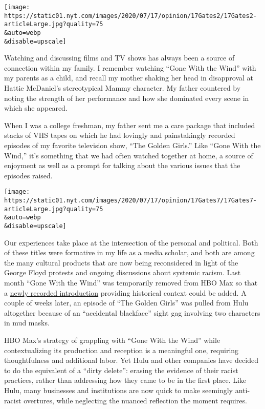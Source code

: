 \texttt{[image: https://static01.nyt.com/images/2020/07/17/opinion/17Gates2/17Gates2-articleLarge.jpg?quality=75\\\&auto=webp\\\&disable=upscale]}

Watching and discussing films and TV shows has always been a source of
connection within my family. I remember watching ``Gone With the Wind''
with my parents as a child, and recall my mother shaking her head in
disapproval at Hattie McDaniel's stereotypical Mammy character. My
father countered by noting the strength of her performance and how she
dominated every scene in which she appeared.

When I was a college freshman, my father sent me a care package that
included stacks of VHS tapes on which he had lovingly and painstakingly
recorded episodes of my favorite television show, ``The Golden Girls.''
Like ``Gone With the Wind,'' it's something that we had often watched
together at home, a source of enjoyment as well as a prompt for talking
about the various issues that the episodes raised.

\texttt{[image: https://static01.nyt.com/images/2020/07/17/opinion/17Gates7/17Gates7-articleLarge.jpg?quality=75\\\&auto=webp\\\&disable=upscale]}

Our experiences take place at the intersection of the personal and
political. Both of these titles were formative in my life as a media
scholar, and both are among the many cultural products that are now
being reconsidered in light of the George Floyd protests and ongoing
discussions about systemic racism. Last month ``Gone With the Wind'' was
temporarily removed from HBO Max so that a
\href{https://www.youtube.com/watch?v=0DF2FKRToiQ\&feature=emb_title}{newly
recorded introduction} providing historical context could be added. A
couple of weeks later, an episode of ``The Golden Girls'' was pulled
from Hulu altogether because of an ``accidental blackface'' sight gag
involving two characters in mud masks.

HBO Max's strategy of grappling with ``Gone With the Wind'' while
contextualizing its production and reception is a meaningful one,
requiring thoughtfulness and additional labor. Yet Hulu and other
companies have decided to do the equivalent of a ``dirty delete'':
erasing the evidence of their racist practices, rather than addressing
how they came to be in the first place. Like Hulu, many businesses and
institutions are now quick to make seemingly anti-racist overtures,
while neglecting the nuanced reflection the moment requires.

